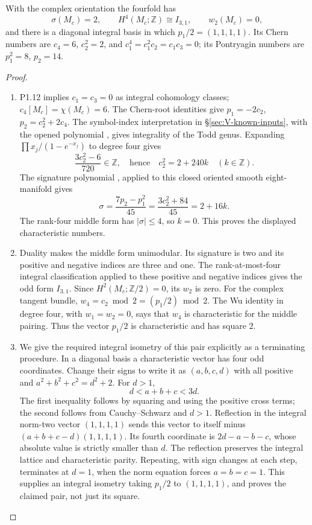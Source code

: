 \begin{theorem}\label{night:P1.13}
With the complex orientation the fourfold has
\[
\sigma(M_c)=2,\qquad H^4(M_c;\mathbb Z)\cong I_{3,1},\qquad
w_2(M_c)=0,
\]
and there is a diagonal integral basis in which
$p_1/2=(1,1,1,1)$.
Its Chern numbers are
$c_4=6$, $c_2^2=2$, and
$c_1^4=c_1^2c_2=c_1c_3=0$; its Pontryagin numbers are
$p_1^2=8$, $p_2=14$.
\end{theorem}
\begin{proof}
\begin{enumerate}[label=\arabic*.]
\item P1.12 implies $c_1=c_3=0$ as integral cohomology classes;
$c_4[M_c]=\chi(M_c)=6$.  The Chern-root identities give
$p_1=-2c_2$, $p_2=c_2^2+2c_4$.
The symbol-index interpretation in \S\ref{sec:V-known-inputs},
with the opened polynomial \cite[equation (1.2), p.~3]{ffEsoleKang},
gives integrality of the Todd genus. Expanding
$\prod x_j/(1-e^{-x_j})$ to degree four gives
\[
\frac{3c_2^2-6}{720}\in\mathbb Z,
\quad\text{hence}\quad c_2^2=2+240k\quad(k\in\mathbb Z).
\]
The signature polynomial \cite[equation (1.4), p.~4]{ffEsoleKang}, applied to
this closed oriented smooth eight-manifold gives
\[
\sigma=\frac{7p_2-p_1^2}{45}
      =\frac{3c_2^2+84}{45}=2+16k.
\]
The rank-four middle form has $|\sigma|\leq4$, so $k=0$.
This proves the displayed characteristic numbers.

\item Duality makes the middle form unimodular.  Its signature is two and
its positive and negative indices are three and one.  The rank-at-most-four integral classification
\cite[Theorem 2.2.1, p.~61]{ffPetersSterk} applied to these
positive and negative indices gives the odd form \(I_{3,1}\).
Since $H^2(M_c;\mathbb Z/2)=0$, its $w_2$ is zero.
For the complex tangent bundle,
$w_4=c_2\bmod2=(p_1/2)\bmod2$.
The Wu identity in degree four, with $w_1=w_2=0$, says that $w_4$ is
characteristic for the middle pairing.  Thus the vector $p_1/2$ is
characteristic and has square $2$.

\item We give the required integral isometry of this pair explicitly as
a terminating procedure.  In a diagonal basis a characteristic vector
has four odd coordinates.  Change their signs to write it as
$(a,b,c,d)$ with all positive and
$a^2+b^2+c^2=d^2+2$.
For $d>1$,
\[
d<a+b+c<3d.
\]
The first inequality follows by squaring and using the positive cross
terms; the second follows from Cauchy--Schwarz and $d>1$.
Reflection in the integral norm-two vector $(1,1,1,1)$ sends this
vector to itself minus $(a+b+c-d)(1,1,1,1)$.
Its fourth coordinate is $2d-a-b-c$, whose absolute value is strictly
smaller than $d$.  The reflection preserves the integral lattice and
characteristic parity.  Repeating, with sign changes at each step,
terminates at $d=1$, when the norm equation forces $a=b=c=1$.
This supplies an integral isometry taking $p_1/2$ to $(1,1,1,1)$,
and proves the claimed pair, not just its square.


\end{enumerate}
\end{proof}
